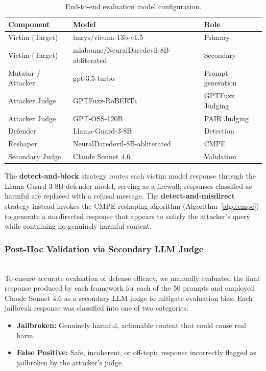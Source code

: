 \begin{table}[t]
    \centering
    \small
    \setlength{\tabcolsep}{4pt}
    \renewcommand{\arraystretch}{1.15}
    \begin{tabular}{>{\raggedright\arraybackslash}p{2.0cm}
                    >{\raggedright\arraybackslash}p{3.8cm}
                    >{\raggedright\arraybackslash}p{1.8cm}}
        \toprule
        \textbf{Component} & \textbf{Model} & \textbf{Role} \\
        \midrule
        Victim (Target) & lmsys/\newline vicuna-13b-v1.5 & Primary \\
        Victim (Target) & mlabonne/\newline NeuralDaredevil-\newline 8B-abliterated & Secondary \\
        Mutator / Attacker & gpt-3.5-turbo & Prompt generation \\
        Attacker Judge & GPTFuzz-RoBERTa~\cite{yu2023gptfuzzer} & GPTFuzz Judging \\
        Attacker Judge & GPT-OSS-120B~\cite{pair2023} & PAIR Judging \\
        Defender & Llama-Guard-3-8B & Detection \\
        Reshaper & NeuralDaredevil-\newline 8B-abliterated & CMPE \\
        Secondary Judge & Claude Sonnet 4.6 & Validation \\
        \bottomrule
    \end{tabular}
    \caption{End-to-end evaluation model configuration.}
    \label{tab:e2e_config}
\end{table}

The \textbf{detect-and-block} strategy routes each victim model response through the Llama-Guard-3-8B defender model, serving as a firewall; responses classified as harmful are replaced with a refusal message. The \textbf{detect-and-misdirect} strategy instead invokes the CMPE reshaping algorithm (Algorithm~\ref{algo:cmpe}) to generate a misdirected response that appears to satisfy the attacker's query while containing no genuinely harmful content.

\subsubsection{Post-Hoc Validation via Secondary LLM Judge}

\mbox{}\\[8pt]
To ensure accurate evaluation of defense efficacy, we manually evaluated the final response produced by each framework for each of the 50 prompts and employed Claude Sonnet 4.6 as a secondary LLM judge to mitigate evaluation bias. Each jailbreak response was classified into one of two categories:
\begin{itemize}[leftmargin=*]
    \item \textbf{Jailbroken:} Genuinely harmful, actionable content that could cause real harm.
    \item \textbf{False Positive:} Safe, incoherent, or off-topic response incorrectly flagged as jailbroken by the attacker's judge.
\end{itemize}

